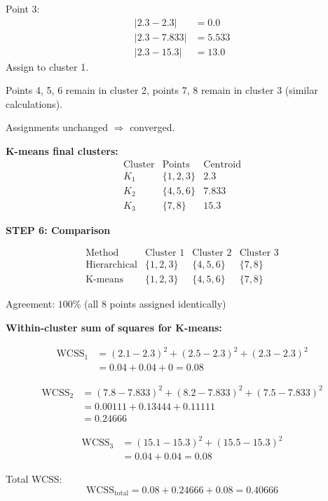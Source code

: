 \documentclass[12pt]{article}
\begin{document}
\begin{solution}
Point 3:
\begin{align*}
|2.3 - 2.3| &= 0.0 \\
|2.3 - 7.833| &= 5.533 \\
|2.3 - 15.3| &= 13.0
\end{align*}
Assign to cluster 1.

Points 4, 5, 6 remain in cluster 2, points 7, 8 remain in cluster 3 (similar calculations).

Assignments unchanged $\Rightarrow$ converged.

\textbf{K-means final clusters:}
\[
\boxed{
\begin{array}{c|c|c}
\text{Cluster} & \text{Points} & \text{Centroid} \\
\hline
K_1 & \{1, 2, 3\} & 2.3 \\
K_2 & \{4, 5, 6\} & 7.833 \\
K_3 & \{7, 8\} & 15.3
\end{array}
}
\]

\textbf{STEP 6: Comparison}

\[
\begin{array}{c|c|c|c}
\text{Method} & \text{Cluster 1} & \text{Cluster 2} & \text{Cluster 3} \\
\hline
\text{Hierarchical} & \{1,2,3\} & \{4,5,6\} & \{7,8\} \\
\text{K-means} & \{1,2,3\} & \{4,5,6\} & \{7,8\}
\end{array}
\]

Agreement: $100\%$ (all 8 points assigned identically)

\textbf{Within-cluster sum of squares for K-means:}

\begin{align*}
\text{WCSS}_1 &= (2.1-2.3)^2 + (2.5-2.3)^2 + (2.3-2.3)^2 \\
&= 0.04 + 0.04 + 0 = 0.08
\end{align*}

\begin{align*}
\text{WCSS}_2 &= (7.8-7.833)^2 + (8.2-7.833)^2 + (7.5-7.833)^2 \\
&= 0.00111 + 0.13444 + 0.11111 \\
&= 0.24666
\end{align*}

\begin{align*}
\text{WCSS}_3 &= (15.1-15.3)^2 + (15.5-15.3)^2 \\
&= 0.04 + 0.04 = 0.08
\end{align*}

Total WCSS:
\[
\text{WCSS}_{\text{total}} = 0.08 + 0.24666 + 0.08 = 0.40666
\]

\end{solution}
\end{document}

